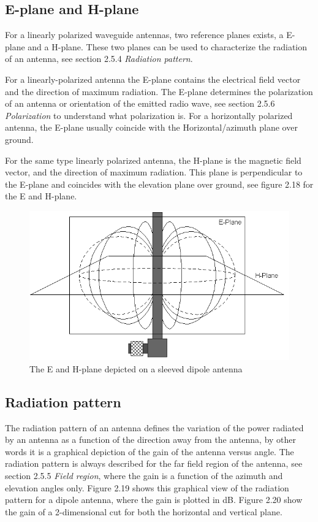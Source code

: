 \subsection{E-plane and H-plane}
For a linearly polarized waveguide antennas, two reference planes exists, a E-plane and a H-plane. These two planes can be used to characterize the radiation of an antenna, see section 2.5.4 \textit{Radiation pattern}.

For a linearly-polarized antenna the E-plane contains the electrical field vector and the direction of maximum radiation. The E-plane determines the polarization of an antenna or orientation of the emitted radio wave, see section 2.5.6 \textit{Polarization} to understand what polarization is. For a horizontally polarized antenna, the E-plane usually coincide with the Horizontal/azimuth plane over ground. 

For the same type linearly polarized antenna, the H-plane is the magnetic field vector, and the direction of maximum radiation. This plane is perpendicular to the E-plane and coincides with the elevation plane over ground, see figure 2.18 for the E and H-plane. 

\begin{figure}[h]
\hspace{-0.5cm}
\includegraphics[scale=0.74]{figures/EH_Plane.png}
\caption{The E and H-plane depicted on a sleeved dipole antenna \cite{EH-plane}}
\end{figure}

\subsection{Radiation pattern}
The radiation pattern of an antenna defines the variation of the power radiated by an antenna as a function of the direction away from the antenna, by other words it is a graphical depiction of the gain of the antenna versus angle. The radiation pattern is always described for the far field region of the antenna, see section 2.5.5 \textit{Field region}, where the gain is a function of the azimuth and elevation angles only. Figure 2.19 shows this graphical view of the radiation pattern for a dipole antenna, where the gain is plotted in dB. Figure 2.20 show the gain of a 2-dimensional cut for both the horizontal and vertical plane. 

